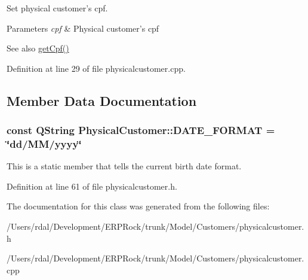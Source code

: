\-Set physical customer's cpf. 


\begin{DoxyParams}{\-Parameters}
{\em cpf} & \-Physical customer's cpf \\
\hline
\end{DoxyParams}
\begin{DoxySeeAlso}{\-See also}
\hyperlink{class_physical_customer_a573e7b6f2be5c56e8c884874e4d59f6c}{get\-Cpf()} 
\end{DoxySeeAlso}


\-Definition at line 29 of file physicalcustomer.\-cpp.



\subsection{\-Member \-Data \-Documentation}
\hypertarget{class_physical_customer_a1aadc9fd1fde92bdadddd8853beb7d74}{
\subsubsection[{\-D\-A\-T\-E\-\_\-\-F\-O\-R\-M\-A\-T}]{\setlength{\rightskip}{0pt plus 5cm}const \-Q\-String {\bf \-Physical\-Customer\-::\-D\-A\-T\-E\-\_\-\-F\-O\-R\-M\-A\-T} = \char`\"{}dd/\-M\-M/yyyy\char`\"{}}}\label{class_physical_customer_a1aadc9fd1fde92bdadddd8853beb7d74}
\-This is a static member that tells the current birth date format. 

\-Definition at line 61 of file physicalcustomer.\-h.



\-The documentation for this class was generated from the following files\-:\begin{DoxyCompactItemize}
\item 
/\-Users/rdal/\-Development/\-E\-R\-P\-Rock/trunk/\-Model/\-Customers/physicalcustomer.\-h\item 
/\-Users/rdal/\-Development/\-E\-R\-P\-Rock/trunk/\-Model/\-Customers/physicalcustomer.\-cpp\end{DoxyCompactItemize}
